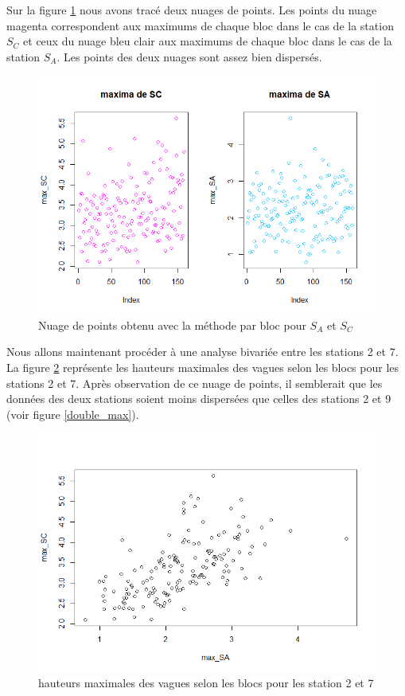 \documentclass[a4paper,french,10pt]{article}
\begin{document}
Sur la figure \ref{max_SA_SC} nous avons tracé deux nuages de points. Les points du nuage magenta correspondent aux maximums de chaque bloc dans le cas de la station $S_C$ et ceux du nuage bleu clair aux maximums de chaque bloc dans le cas de la station $S_A$. Les points des deux nuages sont assez bien dispersés.
\begin{figure}[htp] 
	\centering
	\includegraphics[scale=0.45]{images/max_SA_SC.png}
	\caption{Nuage de points obtenu avec la méthode par bloc pour $S_A$ et $S_C$}
	\label{max_SA_SC}
\end{figure}

Nous allons maintenant procéder à une analyse bivariée entre les stations 2 et 7. La figure \ref{double_max2} représente les hauteurs maximales des vagues selon les blocs pour les stations 2 et 7. Après observation de ce nuage de points, il semblerait que les données des deux stations soient moins dispersées que celles des stations 2 et 9 (voir figure \ref{double_max}).

\begin{figure}[htp] 
	\centering
	\includegraphics[scale=0.45]{images/double_max2.png}
	\caption{hauteurs maximales des vagues selon les blocs pour les station 2 et 7}
	\label{double_max2}
\end{figure}
\end{document}
